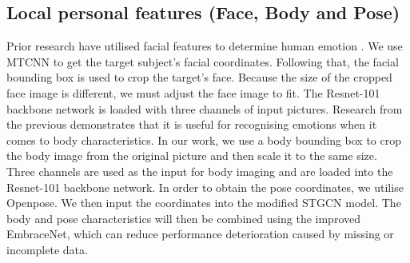 \documentclass[conference]{IEEEtran}
\begin{document}
\subsection{Local personal features (Face, Body and Pose) }
Prior research have utilised facial features to determine human emotion \cite{ref-25}. We use MTCNN \cite{ref-26} to get the target subject's facial coordinates. Following that, the facial bounding box is used to crop the target's face. Because the size of the cropped face image is different, we must adjust the face image to fit. The Resnet-101 backbone network is loaded with three channels of input pictures. Research from the previous demonstrates that it is useful for recognising emotions when it comes to body characteristics\cite{ref-25}. In our work, we use a body bounding box to crop the body image from the original picture and then scale it to the same size. Three channels are used as the input for body imaging and are loaded into the Resnet-101 backbone network. In order to obtain the pose coordinates, we utilise Openpose\cite{ref-43}. We then input the coordinates into the modified STGCN \cite{ref-44} model. The body and pose characteristics will then be combined using the improved EmbraceNet, which can reduce performance deterioration caused by missing or incomplete data.
\end{document}
